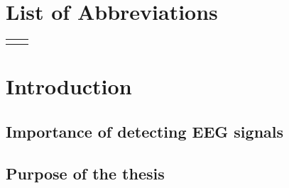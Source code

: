 \documentclass[12pt,a4paper,titlepage,openany]{report}
\begin{document}
\newpage

\tableofcontents
{}
\newpage
\listoftables
{}
\newpage
\listoffigures
{}
\newpage
\renewcommand{\cftdot}{}
\listofappendices{}
\thispagestyle{fancy}
\newpage

\chapter*{List of Abbreviations}
\thispagestyle{fancyplain}
\begin{longtable}{@{}p{1cm}@{}p{\dimexpr\textwidth-1cm\relax}@{}}
\nomenclature{{\it i.e.}}{that is}
\nomenclature{{\it e.g.}}{for example}
\end{longtable}
\newpage

\normalsize


% 
% 



\chapter{Introduction}
\thispagestyle{fancy}

\section{Importance of detecting EEG signals}

\section{Purpose of the thesis}
\end{document}
